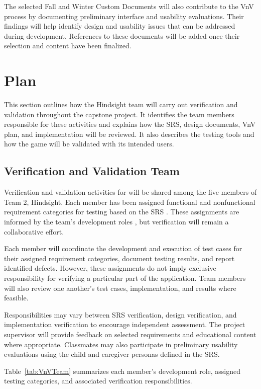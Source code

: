 \documentclass[10pt,titlepage]{article}
\begin{document}
The selected Fall and Winter Custom Documents will also
contribute to the VnV process by documenting preliminary
interface and usability evaluations. Their findings will
help identify design and usability issues that can be
addressed during development. References to these
documents will be added once their selection and content
have been finalized.

\newpage
\section{Plan}

This section outlines how the Hindsight team will carry out verification
and validation throughout the capstone project. It identifies the team members
responsible for these activities and explains how the SRS, design documents,
VnV plan, and implementation will be reviewed. It also describes the testing
tools and how the game will be validated with its intended users.

\subsection{Verification and Validation Team}\label{sec:vnvTeam}

Verification and validation activities for \progname{} will
be shared among the five members of Team 2, Hindsight.
Each member has been assigned functional and nonfunctional
requirement categories for testing based on the SRS
\cite{SRS}. These assignments are informed by the
team's development roles \cite{DevPlan}, but verification
will remain a collaborative effort. 

Each member will coordinate the development and execution
of test cases for their assigned requirement categories,
document testing results, and report identified defects.
However, these assignments do not imply exclusive
responsibility for verifying a particular part of the
application. Team members will also review one another's
test cases, implementation, and results where feasible. 

Responsibilities may vary between SRS verification, design
verification, and implementation verification to encourage
independent assessment. The project supervisor will provide
feedback on selected requirements and educational content
where appropriate. Classmates may also participate in
preliminary usability evaluations using the child and
caregiver personas defined in the SRS. 

Table~\ref{tab:VnVTeam} summarizes each member's
development role, assigned testing categories, and
associated verification responsibilities. 
\end{document}
